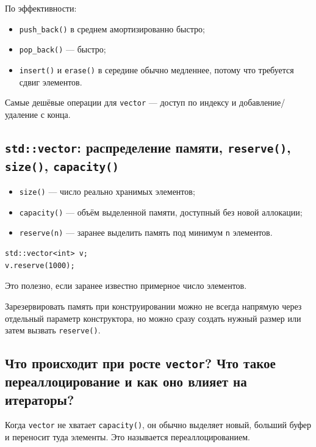 По эффективности:
\begin{itemize}
    \item \texttt{push\_back()} в среднем амортизированно быстро;
    \item \texttt{pop\_back()} — быстро;
    \item \texttt{insert()} и \texttt{erase()} в середине обычно медленнее, потому что требуется сдвиг элементов.
\end{itemize}

\begin{remark}
Самые дешёвые операции для \texttt{vector} — доступ по индексу и добавление/удаление с конца.
\end{remark}

\subsection{\texttt{std::vector}: распределение памяти, \texttt{reserve()}, \texttt{size()}, \texttt{capacity()}}
\begin{itemize}
    \item \texttt{size()} — число реально хранимых элементов;
    \item \texttt{capacity()} — объём выделенной памяти, доступный без новой аллокации;
    \item \texttt{reserve(n)} — заранее выделить память под минимум \texttt{n} элементов.
\end{itemize}

\begin{example}
\begin{verbatim}
std::vector<int> v;
v.reserve(1000);
\end{verbatim}
\end{example}

Это полезно, если заранее известно примерное число элементов.

\begin{remark}
Зарезервировать память при конструировании можно не всегда напрямую через отдельный параметр конструктора, но можно сразу создать нужный размер или затем вызвать \texttt{reserve()}.
\end{remark}

\subsection{Что происходит при росте \texttt{vector}? Что такое переаллоцирование и как оно влияет на итераторы?}
Когда \texttt{vector} не хватает \texttt{capacity()}, он обычно выделяет новый, больший буфер и переносит туда элементы. Это называется переаллоцированием.

